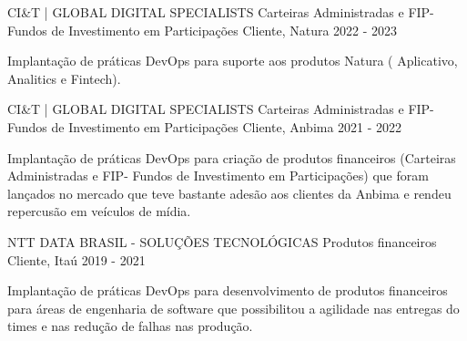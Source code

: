 

\begin{cventries}

  \cventry
    {CI\&T | GLOBAL DIGITAL SPECIALISTS} %
    {Carteiras Administradas e FIP-Fundos de Investimento em Participações} %
    {Cliente, Natura} %
    {2022 - 2023} %
    {
      \begin{cvitems} %
        \item {Implantação de práticas DevOps para suporte aos produtos Natura ( Aplicativo, Analitics e Fintech).}
      \end{cvitems}
    }
  \cventry
    {CI\&T | GLOBAL DIGITAL SPECIALISTS} %
    {Carteiras Administradas e FIP-Fundos de Investimento em Participações} %
    {Cliente, Anbima} %
    {2021 - 2022} %
    {
      \begin{cvitems} %
        \item {Implantação de práticas DevOps para criação de produtos financeiros (Carteiras Administradas e FIP- Fundos de Investimento em Participações) que foram lançados no mercado que teve bastante adesão aos clientes da Anbima e rendeu repercusão em veículos de mídia.}
      \end{cvitems}
    }

  \cventry
    {NTT DATA BRASIL - SOLUÇÕES TECNOLÓGICAS} %
    {Produtos financeiros} %
    {Cliente, Itaú} %
    {2019 - 2021} %
    {
      \begin{cvitems} %
        \item {Implantação de práticas DevOps para desenvolvimento de produtos financeiros para áreas de engenharia de software que possibilitou a agilidade nas entregas do times e nas redução de falhas nas produção.}
      \end{cvitems}
    }

\end{cventries}
